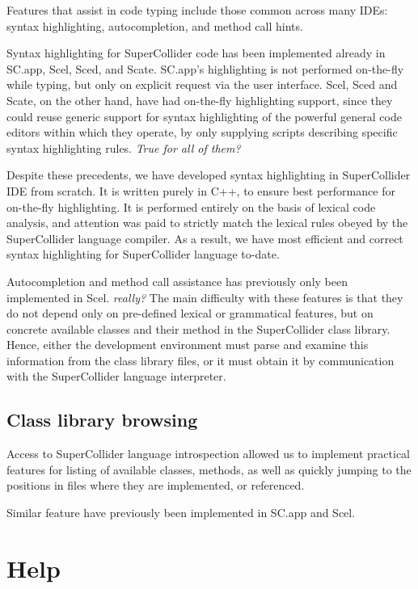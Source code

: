 \documentclass[a4paper,10pt]{article}
\begin{document}
Features that assist in code typing include those common across many IDEs: syntax highlighting,
autocompletion, and method call hints.

Syntax highlighting for SuperCollider code has been implemented already in SC.app, Scel, Sced, and
Scate. SC.app's highlighting is not performed on-the-fly while typing, but only on explicit request
via the user interface. Scel, Sced and Scate, on the other hand, have had on-the-fly highlighting
support, since they could reuse generic support for syntax highlighting of the powerful general code
editors within which they operate, by only supplying scripts describing specific syntax highlighting
rules. \emph{True for all of them?}

Despite these precedents, we have developed syntax highlighting in SuperCollider IDE from scratch.
It is written purely in C++, to ensure best performance for on-the-fly highlighting. It is performed
entirely on the basis of lexical code analysis, and attention was paid to strictly match the lexical
rules obeyed by the SuperCollider language compiler. As a result, we have most efficient and correct
syntax highlighting for SuperCollider language to-date.

Autocompletion and method call assistance has previously only been implemented in Scel. \emph{really?}
The main difficulty with these features is that they do not depend only on pre-defined lexical or
grammatical features, but on concrete available classes and their method in the SuperCollider class
library. Hence, either the development environment must parse and examine this information from the
class library files, or it must obtain it by communication with the SuperCollider language
interpreter.

\subsection{Class library browsing}

Access to SuperCollider language introspection allowed us to implement practical features for
listing of available classes, methods, as well as quickly jumping to the positions in files
where they are implemented, or referenced.

Similar feature have previously been implemented in SC.app and Scel.

\section{Help}
\end{document}
